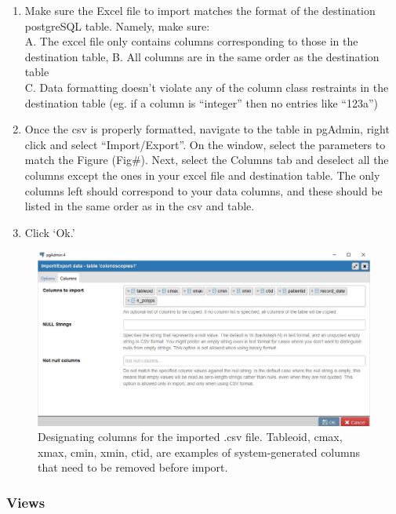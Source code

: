 \documentclass[]{article}
\begin{document}
\begin{enumerate}
\def\labelenumi{\arabic{enumi}.}
\setcounter{enumi}{1}
\item
  Make sure the Excel file to import matches the format of the
  destination postgreSQL table. Namely, make sure:\\
  A. The excel file only contains columns corresponding to those in the
  destination table, B. All columns are in the same order as the
  destination table\\
  C. Data formatting doesn't violate any of the column class restraints
  in the destination table (eg. if a column is ``integer'' then no
  entries like ``123a'')
\item
  Once the csv is properly formatted, navigate to the table in pgAdmin,
  right click and select ``Import/Export''. On the window, select the
  parameters to match the Figure (Fig\#). Next, select the Columns tab
  and deselect all the columns except the ones in your excel file and
  destination table. The only columns left should correspond to your
  data columns, and these should be listed in the same order as in the
  csv and table.
\item
  Click `Ok.'
\end{enumerate}

\begin{figure}[htbp]
\centering
\includegraphics{csv_colselect.jpg}
\caption{Designating columns for the imported .csv file. Tableoid, cmax,
xmax, cmin, xmin, ctid, are examples of system-generated columns that
need to be removed before import.}
\end{figure}

\subsubsection{Views}\label{views}
\end{document}
